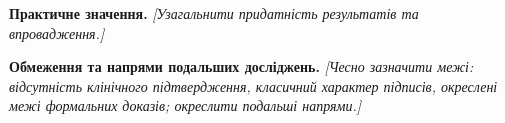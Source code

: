 \noindent\textbf{Практичне значення.} \emph{[Узагальнити придатність результатів та впровадження.]}

\medskip
\noindent\textbf{Обмеження та напрями подальших досліджень.} \emph{[Чесно зазначити межі: відсутність клінічного підтвердження, класичний характер підписів, окреслені межі формальних доказів; окреслити подальші напрями.]}

